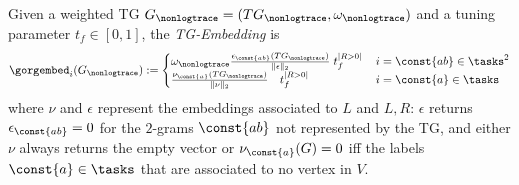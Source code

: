 \begin{definition}[TG-Embedding]\label{def:ppne}
	Given a weighted TG $G_\nonlogtrace=(TG_{\nonlogtrace},\omega_\nonlogtrace)$ and a tuning parameter $t_f\in[0,1]$, the \emph{TG-Embedding} is 
	$$\gorgembed_{i}(G_\nonlogtrace):=\begin{cases}
	\omega_\nonlogtrace \frac{\epsilon_\const{ab}(TG_{\nonlogtrace})}{\|\epsilon\|_2}\;t_f^{|R>0|}\, & {i}=\const{ab}\in\tasks^2\\
	\frac{\nu_\const{a}(TG_{\nonlogtrace})}{\|\nu\|_2}\;\;\;\,t_f^{|R>0|}\, & {i}=\const{a}\in\tasks\\
	\end{cases}$$
	where $\nu$ and $\epsilon$ represent the embeddings associated to $L$ and $L,R$: $\epsilon$  returns 
	$\epsilon_\const{ab}=0$ for the $2$-grams $\const{ab}$ not represented by the TG, and either $\nu$ always returns the empty 
	vector or $\nu_\const{a}(G)=0$ iff the labels $\const{a}\in\tasks$ that are associated to no vertex in $V$.
\end{definition}
